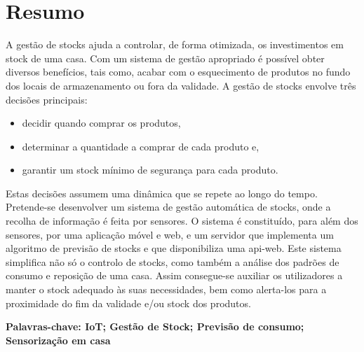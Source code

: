 \cleardoublepage\newpage
\chapter*{Resumo} \label{resumo}
A gestão de stocks ajuda a controlar, de forma otimizada, os investimentos em stock de uma casa. Com um sistema de gestão apropriado é possível obter diversos benefícios, tais como, acabar com o esquecimento de produtos no fundo dos locais de armazenamento ou fora da validade.
A gestão de stocks envolve três decisões principais:
\begin{itemize}
	\item decidir quando comprar os produtos,
	\item determinar a quantidade a comprar de cada produto e,
	\item garantir um stock mínimo de segurança para cada produto.
\end{itemize}
Estas decisões assumem uma dinâmica que se repete ao longo do tempo. Pretende-se desenvolver um sistema de gestão automática de stocks, onde a recolha de informação é feita por sensores. O sistema é constituído, para além dos sensores, por uma aplicação móvel e web, e um servidor que implementa um algoritmo de previsão de stocks e que disponibiliza uma \gls{api-web}. Este sistema simplifica não só o controlo de stocks, como também a análise dos padrões de consumo e reposição de uma casa. Assim consegue-se auxiliar os utilizadores a manter o stock adequado às suas necessidades, bem como alerta-los para a proximidade do fim da validade e/ou stock dos produtos.

\vspace{0.2cm}
{\bf Palavras-chave: IoT; Gestão de Stock; Previsão de consumo; Sensorização em casa} 